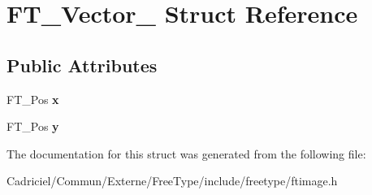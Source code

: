 \hypertarget{struct_f_t___vector__}{\section{F\-T\-\_\-\-Vector\-\_\- Struct Reference}
\label{struct_f_t___vector__}
}
\subsection*{Public Attributes}
\begin{DoxyCompactItemize}
\item 
\hypertarget{struct_f_t___vector___a941e818e6dfca06409cddff4f325f74c}{F\-T\-\_\-\-Pos {\bfseries x}}\label{struct_f_t___vector___a941e818e6dfca06409cddff4f325f74c}

\item 
\hypertarget{struct_f_t___vector___ac3246ed214e880047ec74eeb15f8b973}{F\-T\-\_\-\-Pos {\bfseries y}}\label{struct_f_t___vector___ac3246ed214e880047ec74eeb15f8b973}

\end{DoxyCompactItemize}


The documentation for this struct was generated from the following file\-:\begin{DoxyCompactItemize}
\item 
Cadriciel/\-Commun/\-Externe/\-Free\-Type/include/freetype/ftimage.\-h\end{DoxyCompactItemize}
